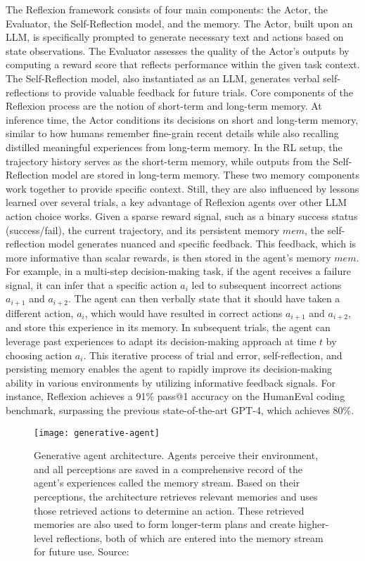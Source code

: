 The Reflexion framework consists of four main components: the Actor, the Evaluator, the Self-Reflection model, and the memory.
The Actor, built upon an LLM, is specifically prompted to generate necessary text and actions based on state observations.
The Evaluator assesses the quality of the Actor's outputs by computing a reward score that reflects performance within the given task context.
The Self-Reflection model, also instantiated as an LLM, generates verbal self-reflections to provide valuable feedback for future trials.
Core components of the Reflexion process are the notion of short-term and long-term memory.
At inference time, the Actor conditions its decisions on short and long-term memory, similar to how humans remember fine-grain recent details while also recalling distilled meaningful experiences from long-term memory.
In the RL setup, the trajectory history serves as the short-term memory, while outputs from the Self-Reflection model are stored in long-term memory.
These two memory components work together to provide specific context.
Still, they are also influenced by lessons learned over several trials, a key advantage of Reflexion agents over other LLM action choice works.
Given a sparse reward signal, such as a binary success status (success/fail), the current trajectory, and its persistent memory \(mem\), the self-reflection model generates nuanced and specific feedback.
This feedback, which is more informative than scalar rewards, is then stored in the agent’s memory \(mem\).
For example, in a multi-step decision-making task, if the agent receives a failure signal, it can infer that a specific action \(a_i\) led to subsequent incorrect actions \(a_{i+1}\) and \(a_{i+2}\).
The agent can then verbally state that it should have taken a different action, \(a_i\), which would have resulted in correct actions \(a_{i+1}\) and \(a_{i+2}\), and store this experience in its memory.
In subsequent trials, the agent can leverage past experiences to adapt its decision-making approach at time \(t\) by choosing action \(a_i\).
This iterative process of trial and error, self-reflection, and persisting memory enables the agent to rapidly improve its decision-making ability in various environments by utilizing informative feedback signals.
For instance, Reflexion achieves a 91\% pass@1 accuracy on the HumanEval coding benchmark, surpassing the previous state-of-the-art GPT-4, which achieves 80\%.

\begin{figure}[h!]
	\centering
	\texttt{[image: generative-agent]}
	\caption{Generative agent architecture. Agents perceive their environment, and all perceptions are saved in a comprehensive record of the agent’s experiences called the memory stream. Based on their perceptions, the architecture retrieves relevant memories and uses those retrieved actions to determine an action. These retrieved memories are also used to form longer-term plans and create higher-level reflections, both of which are entered into the memory stream for future use. Source: \textcite{park2023generativeagentsinteractivesimulacra}}
	\label{fig:generative-agents}
\end{figure}

